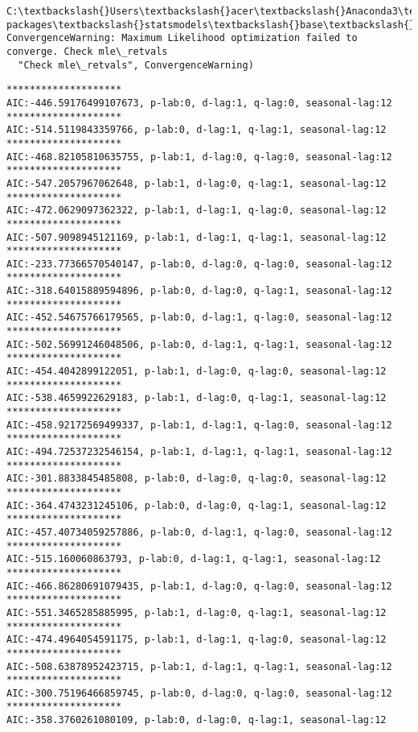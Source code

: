 \documentclass[11pt]{article}
\begin{document}
    \begin{Verbatim}[commandchars=\\\{\}]
C:\textbackslash{}Users\textbackslash{}acer\textbackslash{}Anaconda3\textbackslash{}lib\textbackslash{}site-packages\textbackslash{}statsmodels\textbackslash{}base\textbackslash{}model.py:508: ConvergenceWarning: Maximum Likelihood optimization failed to converge. Check mle\_retvals
  "Check mle\_retvals", ConvergenceWarning)

    \end{Verbatim}

    \begin{Verbatim}[commandchars=\\\{\}]
********************
AIC:-446.59176499107673, p-lab:0, d-lag:1, q-lag:0, seasonal-lag:12
********************
AIC:-514.5119843359766, p-lab:0, d-lag:1, q-lag:1, seasonal-lag:12
********************
AIC:-468.82105810635755, p-lab:1, d-lag:0, q-lag:0, seasonal-lag:12
********************
AIC:-547.2057967062648, p-lab:1, d-lag:0, q-lag:1, seasonal-lag:12
********************
AIC:-472.0629097362322, p-lab:1, d-lag:1, q-lag:0, seasonal-lag:12
********************
AIC:-507.9098945121169, p-lab:1, d-lag:1, q-lag:1, seasonal-lag:12
********************
AIC:-233.77366570540147, p-lab:0, d-lag:0, q-lag:0, seasonal-lag:12
********************
AIC:-318.64015889594896, p-lab:0, d-lag:0, q-lag:1, seasonal-lag:12
********************
AIC:-452.54675766179565, p-lab:0, d-lag:1, q-lag:0, seasonal-lag:12
********************
AIC:-502.56991246048506, p-lab:0, d-lag:1, q-lag:1, seasonal-lag:12
********************
AIC:-454.4042899122051, p-lab:1, d-lag:0, q-lag:0, seasonal-lag:12
********************
AIC:-538.4659922629183, p-lab:1, d-lag:0, q-lag:1, seasonal-lag:12
********************
AIC:-458.92172569499337, p-lab:1, d-lag:1, q-lag:0, seasonal-lag:12
********************
AIC:-494.72537232546154, p-lab:1, d-lag:1, q-lag:1, seasonal-lag:12
********************
AIC:-301.8833845485808, p-lab:0, d-lag:0, q-lag:0, seasonal-lag:12
********************
AIC:-364.4743231245106, p-lab:0, d-lag:0, q-lag:1, seasonal-lag:12
********************
AIC:-457.40734059257886, p-lab:0, d-lag:1, q-lag:0, seasonal-lag:12
********************
AIC:-515.160060863793, p-lab:0, d-lag:1, q-lag:1, seasonal-lag:12
********************
AIC:-466.86280691079435, p-lab:1, d-lag:0, q-lag:0, seasonal-lag:12
********************
AIC:-551.3465285885995, p-lab:1, d-lag:0, q-lag:1, seasonal-lag:12
********************
AIC:-474.4964054591175, p-lab:1, d-lag:1, q-lag:0, seasonal-lag:12
********************
AIC:-508.63878952423715, p-lab:1, d-lag:1, q-lag:1, seasonal-lag:12
********************
AIC:-300.75196466859745, p-lab:0, d-lag:0, q-lag:0, seasonal-lag:12
********************
AIC:-358.3760261080109, p-lab:0, d-lag:0, q-lag:1, seasonal-lag:12

    \end{Verbatim}
\end{document}
